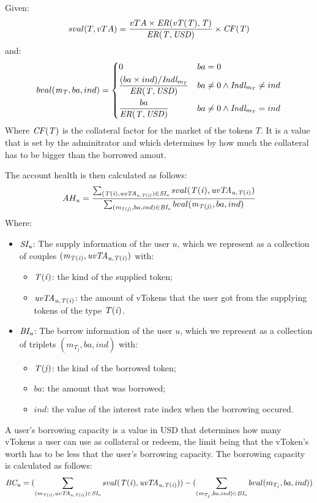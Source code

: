 \noindent Given:
$$
  sval(T, vTA) = \frac{vTA \times \mathit{ER(\mathit{vT(T)}, T)}}{\mathit{ER(T, \mathit{USD})}} \times \mathit{CF(T)}
$$
and:
$$
  bval(\mathit{m_{T}}, ba, ind) =\begin{dcases}
    0 & ba = 0\\
    \frac{(ba \times ind)/ \mathit{Indl_{\mathit{m_{T}}}}}{\mathit{ER(T, \mathit{USD})}} & ba \neq 0 \wedge \mathit{Indl_{\mathit{m_{T}}}} \neq ind \\
    \frac{ba}{\mathit{ER(T, \mathit{USD})}} & ba \neq 0 \wedge \mathit{Indl_{\mathit{m_{T}}}} = ind
    \end{dcases}
$$
Where $\mathit{CF(T)}$ is the collateral factor for the market of the tokens $T$. It is a value that is set by the adminitrator and which determines by how much the collateral has to be bigger than the borrowed amout.

The account health is then calculated as follows:
$$
  AH_u =
    \frac {
      \sum_{(\mathit{T(i)}, \mathit{uvTA_{u, \mathit{T(i)}}}) \in \mathit{SI_{u}}}
        sval(\mathit{T(i)}, \mathit{uvTA_{u, \mathit{T(i)}}})
    } {
      \sum_{(\mathit{m_{\mathit{T(j)}}}, ba, ind) \in \mathit{BI_{u}}}
      bval(\mathit{m_{\mathit{T(j)}}}, ba, ind)
    }
$$
Where:
\begin{itemize}
  \item $\mathit{SI_{u}}$: The supply information of the user $u$, which we represent as a collection of couples $(\mathit{m_{\mathit{T(i)}}}, \mathit{uvTA_{u, \mathit{T(i)}}})$ with:
  \begin{itemize}
    \item $\mathit{T(i)}$: the kind of the supplied token;
    \item $\mathit{uvTA_{u, \mathit{T(i)}}}$: the amount of vTokens that the user got from the supplying tokens of the type $\mathit{T(i)}$.
  \end{itemize}
  \item $\mathit{BI_{u}}$: The borrow information of the user $u$, which we represent as a collection of triplets $(m_{T_j}, ba, ind)$ with:
  \begin{itemize}
    \item $\mathit{T(j)}$: the kind of the borrowed token;
    \item $ba$: the amount that was borrowed;
    \item $ind$: the value of the interest rate index when the borrowing occured.
  \end{itemize}
\end{itemize}

A user's borrowing capacity is a value in USD that determines how many vTokens a user can use as collateral or redeem, the limit being that the vToken's worth has to be less that the user's borrowing capacity. The borrowing capacity is calculated as follows:
$$
  \mathit{BC_{u}} = (\sum_{(m_{\mathit{T(i)}}, \mathit{uvTA_{u, \mathit{T(i)}}}) \in \mathit{SI_{u}}} sval(\mathit{T(i)}, \mathit{uvTA_{u, \mathit{T(i)}}})) - (\sum_{(m_{T_j}, ba, ind) \in \mathit{BI_{u}}} bval(m_{T_j}, ba, ind))
$$

